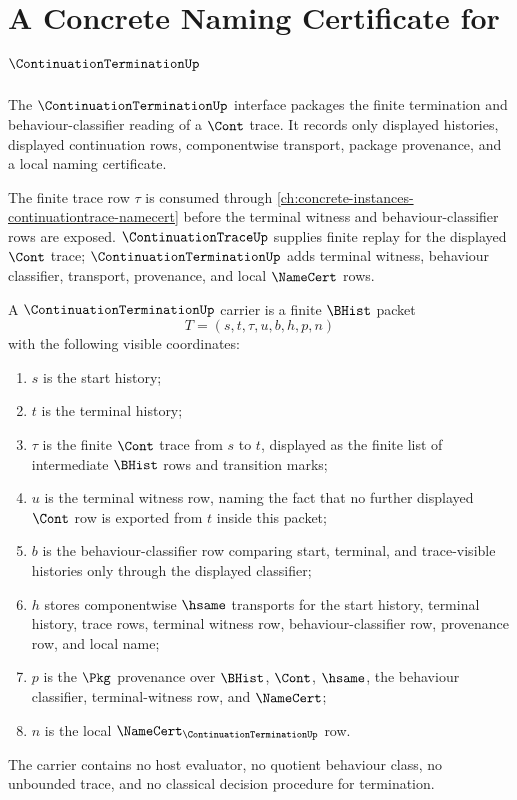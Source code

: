 \chapter{A Concrete Naming Certificate for $\ContinuationTerminationUp$}
\label{ch:concrete-instances-continuationtermination-namecert}

The $\ContinuationTerminationUp$ interface packages the finite termination and behaviour-classifier reading of a $\Cont$ trace. It records only displayed histories, displayed continuation rows, componentwise transport, package provenance, and a local naming certificate.

The finite trace row $\tau$ is consumed through \autoref{ch:concrete-instances-continuationtrace-namecert} before the terminal witness and behaviour-classifier rows are exposed. $\ContinuationTraceUp$ supplies finite replay for the displayed $\Cont$ trace; $\ContinuationTerminationUp$ adds terminal witness, behaviour classifier, transport, provenance, and local $\NameCert$ rows.

\begin{definition}
\label{def:continuation-termination-carrier}
A $\ContinuationTerminationUp$ carrier is a finite $\BHist$ packet
$$
T=(s,t,\tau,u,b,h,p,n)
$$
with the following visible coordinates:
\begin{enumerate}
\item $s$ is the start history;
\item $t$ is the terminal history;
\item $\tau$ is the finite $\Cont$ trace from $s$ to $t$, displayed as the finite list of intermediate $\BHist$ rows and transition marks;
\item $u$ is the terminal witness row, naming the fact that no further displayed $\Cont$ row is exported from $t$ inside this packet;
\item $b$ is the behaviour-classifier row comparing start, terminal, and trace-visible histories only through the displayed classifier;
\item $h$ stores componentwise $\hsame$ transports for the start history, terminal history, trace rows, terminal witness row, behaviour-classifier row, provenance row, and local name;
\item $p$ is the $\Pkg$ provenance over $\BHist$, $\Cont$, $\hsame$, the behaviour classifier, terminal-witness row, and $\NameCert$;
\item $n$ is the local $\NameCert_{\ContinuationTerminationUp}$ row.
\end{enumerate}
The carrier contains no host evaluator, no quotient behaviour class, no unbounded trace, and no classical decision procedure for termination.
\end{definition}

